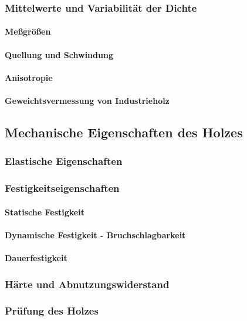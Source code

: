 \documentclass[12pt]{article}
\begin{document}
     
  

\subsubsection{Mittelwerte und Variabilität der Dichte}


\paragraph{Meßgrößen}
\paragraph{Quellung und Schwindung}
\paragraph{Anisotropie}
\paragraph{Geweichtsvermessung von Industrieholz}
\subsection{Mechanische Eigenschaften des Holzes}
\subsubsection{Elastische Eigenschaften}
\subsubsection{Festigkeitseigenschaften}
\paragraph{Statische Festigkeit}
\paragraph{Dynamische Festigkeit - Bruchschlagbarkeit}
\paragraph{Dauerfestigkeit}
\subsubsection{Härte und Abnutzungswiderstand}
\subsubsection{Prüfung des Holzes}
\end{document}
